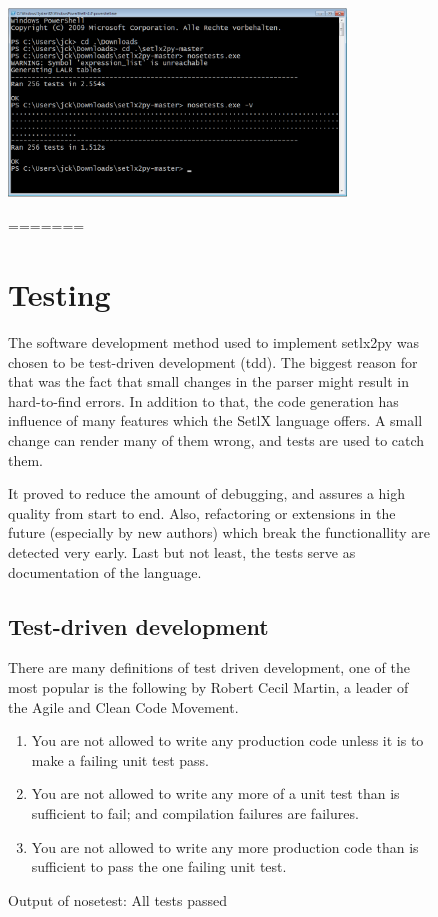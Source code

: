 \begin{figure}[htb]
	\centering
	\includegraphics[width=0.8\textwidth]{img/run-nose.png}
	\caption{Output of nosetest: All tests passed}
=======
\section{Testing}

The software development method used to implement setlx2py was chosen to be test-driven development (\gls{tdd}). The biggest reason for that was the fact that small changes in the parser might result in hard-to-find errors. In addition to that, the code generation has influence of many features which the SetlX language offers. A small change can render many of them wrong, and tests are used to catch them.

It proved to reduce the amount of debugging, and assures a high quality from start to end. Also, refactoring or extensions in the future (especially by new authors) which break the functionallity are detected very early. Last but not least, the tests serve as documentation of the language.

\subsection{Test-driven development}

There are many definitions of test driven development, one of the most popular is the following by Robert Cecil Martin, a leader of the Agile and Clean Code Movement.


\begin{enumerate}
\item You are not allowed to write any production code unless it is to make a failing unit test pass.
\item You are not allowed to write any more of a unit test than is sufficient to fail; and compilation failures are failures.
\item You are not allowed to write any more production code than is sufficient to pass the one failing unit test.
\end{enumerate}


\end{figure}
